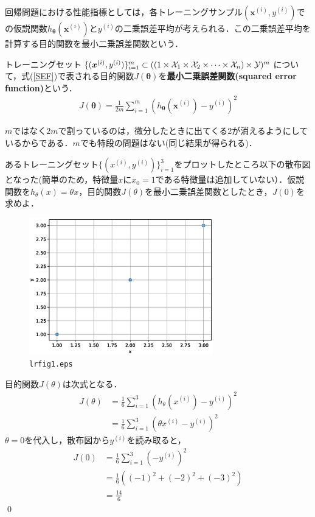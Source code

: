 回帰問題における性能指標としては，各トレーニングサンプル$({\bm x}^{(i)},y^{(i)})$での仮説関数$h_{{\bm \theta}}({\bm x}^{(i)})$と$y^{(i)}$の二乗誤差平均が考えられる．この二乗誤差平均を計算する目的関数を最小二乗誤差関数という．

\begin{defi}[最小二乗誤差関数]
トレーニングセット$\{({\bm x}^{(i)},y^{(i)})\}_{i=1}^m \subset ((1 \times {\cal X}_1 \times {\cal X}_2\times \cdots \times{\cal X}_n) \times {\cal Y})^m$について，式(\ref{SEF})で表される目的関数$J({\bm \theta})$を{\bf 最小二乗誤差関数(squared error function)}という．
\begin{align}
J({\bm \theta}) = \frac{1}{2m}\sum_{i=1}^m (h_{{\bm \theta}}({\bm x}^{(i)})-y^{(i)})^2 \label{SEF}
\end{align}
\end{defi}

\begin{rem}
$m$ではなく$2m$で割っているのは，微分したときに出てくる2が消えるようにしているからである．$m$でも特段の問題はない(同じ結果が得られる)．
\end{rem}

\begin{qu}
あるトレーニングセット$\{(x^{(i)},y^{(i)})\}_{i=1}^3$をプロットしたところ以下の散布図となった(簡単のため，特徴量$x$に$x_0=1$である特徴量は追加していない）．仮説関数を$h_{\theta}(x)=\theta x$，目的関数$J(\theta)$を最小二乗誤差関数としたとき，$J(0)$を求めよ．
\vspace{-10pt}
\begin{figure}[H]
\begin{center}
\includegraphics[width=8.0cm]{code/lrfig1.eps}
\vspace{-10pt}
\caption{\texttt{lrfig1.eps}}
\end{center}
\end{figure}
\vspace{-25pt}
\end{qu}
\begin{ans}
目的関数$J(\theta)$は次式となる．
\begin{align*}
J(\theta)&=\frac{1}{6}\sum_{i=1}^3 (h_{\theta}(x^{(i)})-y^{(i)})^2 \\
&=\frac{1}{6}\sum_{i=1}^3 (\theta x^{(i)}-y^{(i)})^2
\end{align*}
$\theta =0$を代入し，散布図から$y^{(i)}$を読み取ると，
\begin{align*}
J(0)&=\frac{1}{6}\sum_{i=1}^3 (-y^{(i)})^2 \\
&=\frac{1}{6}((-1)^2+(-2)^2+(-3)^2) \\
&= \frac{14}{6}
\end{align*}
\qed
\end{ans}

